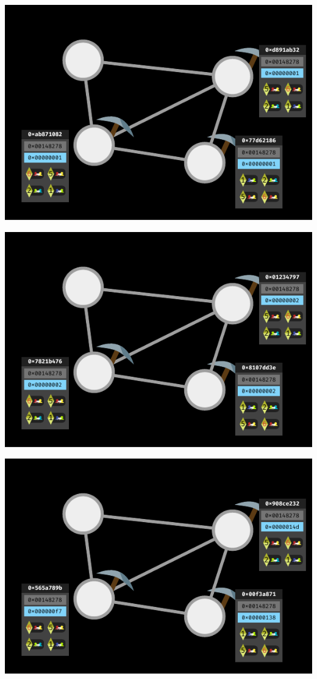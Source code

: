 \documentclass[xcolor=x11names,compress]{beamer}
\begin{document}
\begin{frame}
\begin{overprint}
\begin{center}
		\end{center}
		\begin{center}
			\includegraphics[width=\textwidth,height=0.8\textheight,keepaspectratio]{img/mining/06.pdf}
		\end{center}
		\begin{center}
			\includegraphics[width=\textwidth,height=0.8\textheight,keepaspectratio]{img/mining/07.pdf}
		\end{center}
		\begin{center}
			\includegraphics[width=\textwidth,height=0.8\textheight,keepaspectratio]{img/mining/08.pdf}

\end{center}
\end{overprint}
\end{frame}
\end{document}
